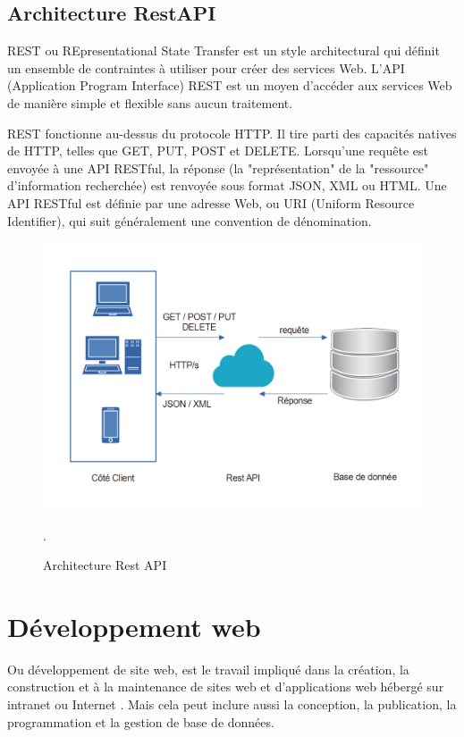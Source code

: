 \subsection{Architecture RestAPI }
\par REST ou REpresentational State Transfer est un style architectural qui
définit un ensemble de contraintes à utiliser pour créer des services Web.
L'API (Application Program Interface) REST est un moyen d'accéder aux services
Web de manière simple et flexible sans aucun traitement.
\par REST fonctionne au-dessus du protocole HTTP. Il tire parti des capacités
natives de HTTP, telles que GET, PUT, POST et DELETE. Lorsqu'une requête est
envoyée à une API RESTful, la réponse (la "représentation" de la "ressource"
d'information recherchée) est renvoyée sous format JSON, XML ou HTML. Une API
RESTful est définie par une adresse Web, ou URI (Uniform Resource Identifier),
qui suit généralement une convention de dénomination.\cite{ref7}
\begin{figure}[H]
\centering
\includegraphics[scale=0.4]{images/figure arch restapi.png}
\caption{Architecture Rest API}.
\label{fig:my_label}
\end{figure}
\section{Développement web }
\par Ou développement de site web, est le travail impliqué dans la création, la
construction et à la maintenance de sites web et d’applications web hébergé sur
intranet ou Internet . Mais cela peut inclure aussi la conception, la
publication, la programmation et la gestion de base de données.
